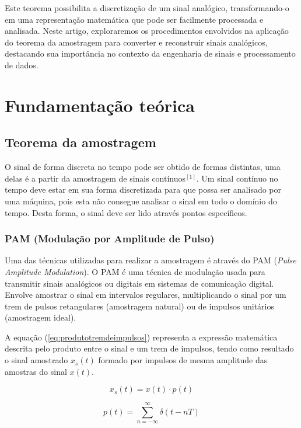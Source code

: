\documentclass[journal]{IEEEtran}
\begin{document}
Este teorema possibilita a discretização de um sinal analógico, transformando-o em uma representação matemática que pode ser facilmente processada e analisada. Neste artigo, exploraremos os procedimentos envolvidos na aplicação do teorema da amostragem para converter e reconstruir sinais analógicos, destacando sua importância no contexto da engenharia de sinais e processamento de dados.

\section{Fundamentação teórica}

\subsection{Teorema da amostragem}

O sinal de forma discreta no tempo pode ser obtido de formas distintas, uma delas é a partir da amostragem de sinais contínuos$^{[1]}$. Um sinal contínuo no tempo deve estar em sua forma discretizada para que possa ser analisado por uma máquina, pois esta não consegue analisar o sinal em todo o domínio do tempo. Desta forma, o sinal deve ser lido através pontos específicos.

\subsubsection{PAM (Modulação por Amplitude de Pulso)}
Uma das técnicas utilizadas para realizar a amostragem é através do PAM (\textit{Pulse Amplitude Modulation}). O PAM é uma técnica de modulação usada para transmitir sinais analógicos ou digitais em sistemas de comunicação digital. Envolve amostrar o sinal em intervalos regulares, multiplicando o sinal por um trem de pulsos retangulares (amostragem natural) ou de impulsos unitários (amostragem ideal).

A equação (\ref{eq:produtotremdeimpulsos}) representa a expressão matemática descrita pelo produto entre o sinal e um trem de impulsos, tendo como resultado o sinal amostrado $x_{s}(t)$ formado por impulsos de mesma amplitude das amostras do sinal $x(t)$.

\begin{equation}\label{eq:produtotremdeimpulsos}
    x_{s}(t) = x(t) \cdot p(t)
\end{equation}

\begin{equation}\label{eq:tremdeimpulsos}
    p(t) = \sum_{n=-\infty}^{\infty} \delta(t - nT)
\end{equation}
\end{document}
